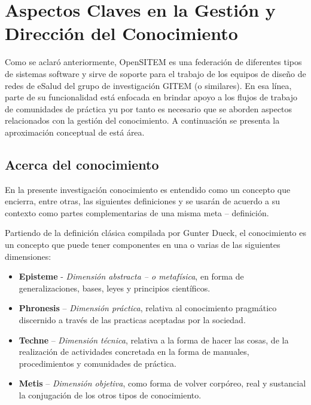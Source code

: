 \section{Aspectos Claves en la Gestión y Dirección del Conocimiento}

Como se aclaró anteriormente, OpenSITEM es una federación de diferentes tipos de sistemas software y sirve de soporte para el trabajo de los equipos de diseño de redes de eSalud del grupo de investigación GITEM (o similares). En esa línea, parte de su funcionalidad está enfocada en brindar apoyo a los flujos de trabajo de comunidades de práctica yu por tanto es necesario que se aborden aspectos relacionados con la gestión del conocimiento. A continuación se presenta la aproximación conceptual de está área.

\subsection{Acerca del conocimiento}

En la presente investigación conocimiento es entendido como un concepto que encierra, entre otras, las siguientes definiciones y se usarán de acuerdo a su contexto como partes complementarias de una misma meta – definición.

Partiendo de la definición clásica compilada por Gunter Dueck\cite{dueck2001}, el conocimiento es un concepto que puede tener componentes en una o varias de las siguientes dimensiones:

\begin{itemize}
\item  \textbf{Episteme} -\textit{ Dimensión abstracta – o metafísica}, en forma de generalizaciones, bases, leyes y principios científicos.

\item \textbf{Phronesis }– \textit{Dimensión práctica}, relativa al conocimiento pragmático discernido a través de las practicas aceptadas por la sociedad.

\item \textbf{Techne} – \textit{Dimensión técnica}, relativa a la forma de hacer las cosas, de la realización de actividades concretada en la forma de manuales, procedimientos y comunidades de práctica.

\item \textbf{Metis} – \textit{Dimensión objetiva}, como forma de volver corpóreo, real y sustancial la conjugación de los otros tipos de conocimiento.
\end{itemize}

